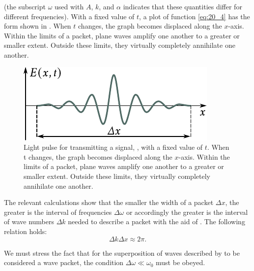 \noindent
(the subscript $\omega$ used with $A$, $k$, and $\alpha$ indicates that these quantities differ for different frequencies).
With a fixed value of $t$, a plot of function \eqref{eq:20_4} has the form shown in .
When $t$ changes, the graph becomes displaced along the $x$-axis.
Within the limits of a packet, plane waves amplify one another to a greater or smaller extent.
Outside these limits, they virtually completely annihilate one another.

\begin{figure}[t]
	\begin{center}
		\includegraphics[scale=1]{figures/ch_20/fig_20_2.pdf}
        \caption[]{Light pulse for transmitting a signal, , with a fixed value of $t$. When t changes, the graph becomes displaced along the $x$-axis. Within the limits of a packet, plane waves amplify one another to a greater or smaller extent. Outside these limits, they virtually completely annihilate one another.}
		\label{fig:20_2}
	\end{center}
	\vspace{-0.8cm}
\end{figure}

The relevant calculations show that the smaller the width of a packet $\Delta{x}$, the greater is the interval of frequencies $\Delta{\omega}$ or accordingly the greater is the interval of wave numbers $\Delta{k}$ needed to describe a packet with the aid of .
The following relation holds:
\begin{equation}\label{eq:20_5}
	\Delta{k} \Delta{x} \approx 2\pi.
\end{equation}

We must stress the fact that for the superposition of waves described by  to be considered a wave packet, the condition $\Delta{\omega}\ll\omega_0$ must be obeyed.


